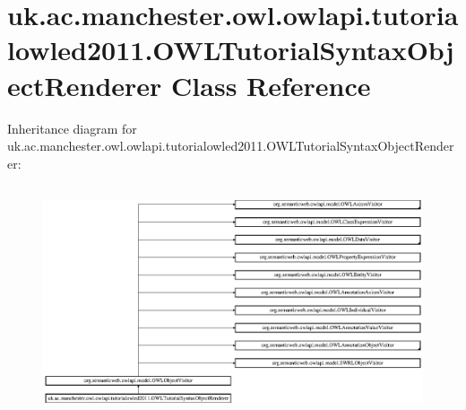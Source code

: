 \hypertarget{classuk_1_1ac_1_1manchester_1_1owl_1_1owlapi_1_1tutorialowled2011_1_1_o_w_l_tutorial_syntax_object_renderer}{\section{uk.\-ac.\-manchester.\-owl.\-owlapi.\-tutorialowled2011.\-O\-W\-L\-Tutorial\-Syntax\-Object\-Renderer Class Reference}
\label{classuk_1_1ac_1_1manchester_1_1owl_1_1owlapi_1_1tutorialowled2011_1_1_o_w_l_tutorial_syntax_object_renderer}
}
Inheritance diagram for uk.\-ac.\-manchester.\-owl.\-owlapi.\-tutorialowled2011.\-O\-W\-L\-Tutorial\-Syntax\-Object\-Renderer\-:\begin{figure}[H]
\begin{center}
\leavevmode
\includegraphics[height=6.885246cm]{classuk_1_1ac_1_1manchester_1_1owl_1_1owlapi_1_1tutorialowled2011_1_1_o_w_l_tutorial_syntax_object_renderer}
\end{center}
\end{figure}
